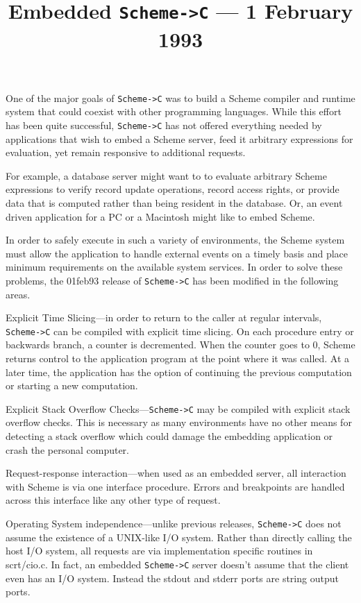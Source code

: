 \documentclass[12pt]{article}
\title{Embedded \texttt{Scheme->C} --- 1 February 1993}
\date{}
\begin{document}
\maketitle

One of the major goals of \texttt{Scheme->C} was to build a Scheme
compiler and runtime system that could coexist with other programming
languages.  While this effort has been quite successful,
\texttt{Scheme->C} has not offered everything needed by applications that
wish to embed a Scheme server, feed it arbitrary expressions for
evaluation, yet remain responsive to additional requests.

For example, a database server might want to to evaluate arbitrary
Scheme expressions to verify record update operations, record access
rights, or provide data that is computed rather than being resident
in the database.  Or, an event driven application for a PC or a
Macintosh might like to embed Scheme.  

In order to safely execute in such a variety of environments, the
Scheme system must allow the application to handle external events on
a timely basis and place minimum requirements on the available system
services. In order to solve these problems, the 01feb93 release of
\texttt{Scheme->C} has been modified in the following areas.

Explicit Time Slicing---in order to return to the caller at regular
intervals, \texttt{Scheme->C} can be compiled with explicit time slicing.
On each procedure entry or backwards branch, a counter is
decremented. When the counter goes to 0, Scheme returns control to
the application program at the point where it was called.  At a later
time, the application has the option of continuing the previous
computation or starting a new computation.

Explicit Stack Overflow Checks---\texttt{Scheme->C} may be compiled with
explicit stack overflow checks.  This is necessary as many
environments have no other means for detecting a stack overflow which
could damage the embedding application or crash the personal
computer.

Request-response interaction---when used as an embedded server, all
interaction with Scheme is via one interface procedure.  Errors and
breakpoints are handled across this interface like any other type of
request.

Operating System independence---unlike previous releases,
\texttt{Scheme->C} does not assume the existence of a UNIX-like I/O
system.  Rather than directly calling the host I/O system, all
requests are via implementation specific routines in scrt/cio.c.  In
fact, an embedded \texttt{Scheme->C} server doesn't assume that the client
even has an I/O system.  Instead the stdout and stderr ports are
string output ports.
\end{document}
